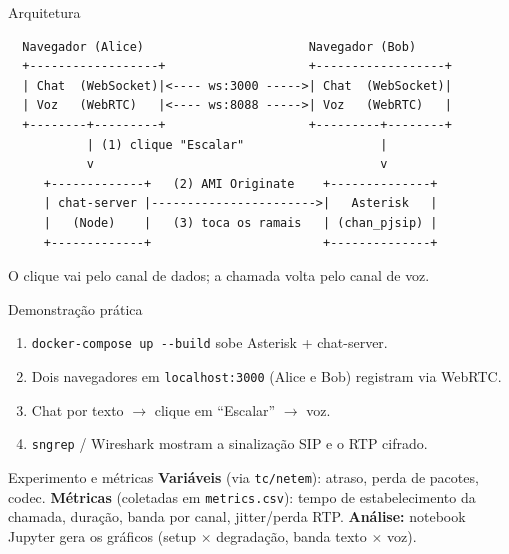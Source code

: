 \documentclass[aspectratio=169]{beamer}
\begin{document}
\begin{frame}[fragile]{Arquitetura}
\begin{lstlisting}
  Navegador (Alice)                       Navegador (Bob)
  +------------------+                    +------------------+
  | Chat  (WebSocket)|<---- ws:3000 ----->| Chat  (WebSocket)|
  | Voz   (WebRTC)   |<---- ws:8088 ----->| Voz   (WebRTC)   |
  +--------+---------+                    +---------+--------+
           | (1) clique "Escalar"                   |
           v                                        v
     +-------------+   (2) AMI Originate    +--------------+
     | chat-server |----------------------->|   Asterisk   |
     |   (Node)    |   (3) toca os ramais   | (chan_pjsip) |
     +-------------+                        +--------------+
\end{lstlisting}
  \small O clique vai pelo canal de \alert{dados}; a chamada volta pelo canal de \alert{voz}.
\end{frame}

\begin{frame}[fragile]{Demonstração prática}
  \begin{enumerate}
    \item \verb|docker-compose up --build| sobe Asterisk + chat-server.
    \item Dois navegadores em \verb|localhost:3000| (Alice e Bob) registram via WebRTC.
    \item Chat por texto $\rightarrow$ clique em \alert{``Escalar''} $\rightarrow$ voz.
    \item \verb|sngrep| / Wireshark mostram a sinalização SIP e o RTP cifrado.
  \end{enumerate}
\end{frame}

\begin{frame}[fragile]{Experimento e métricas}
  \textbf{Variáveis} (via \verb|tc/netem|): atraso, perda de pacotes, codec.
  \vfill
  \textbf{Métricas} (coletadas em \verb|metrics.csv|): tempo de estabelecimento da
  chamada, duração, banda por canal, jitter/perda RTP.
  \vfill
  \textbf{Análise:} notebook Jupyter gera os gráficos (setup $\times$ degradação,
  banda texto $\times$ voz).
\end{frame}
\end{document}
